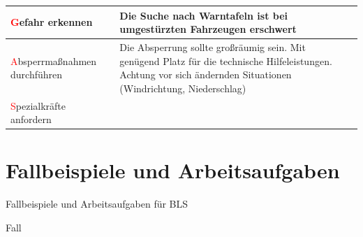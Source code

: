 \documentclass{article}
\begin{document}
\begin{center}
\tablehead{}\begin{supertabular}{|m{2.222cm}|m{5.1460004cm}|m{5.7320004cm}|}
\hline
{\mdseries\color{black} \textcolor{red}{G}efahr erkennen}

 &
Die Suche nach Warntafeln ist bei umgest\"urzten Fahrzeugen erschwert

 &
{%
 \par}

\\\hline
{\mdseries\color{black} \textcolor{red}{A}bsperr\-ma{\ss}nahmen
durch\-f\"uhren}

 &
Die Absperrung sollte gro{\ss}r\"aumig  sein. Mit gen\"ugend Platz f\"ur
die technische Hilfeleistungen. Achtung  vor sich \"andernden
Situationen  (Windrichtung, Niederschlag)

 &
{%
 \par}

\\\hline
{\mdseries\color{black} \textcolor{red}{S}pezial\-kr\"afte anfordern}

 &
 &
{%
 \par}

\\\hline
\end{supertabular}
\end{center}
\section{Fallbeispiele und Arbeitsaufgaben}
{\mdseries\color[rgb]{0.0,0.0,0.5019608}
Fallbeispiele und Arbeitsaufgaben f\"ur BLS}

{\mdseries\color{black}
Fall }
\end{document}
